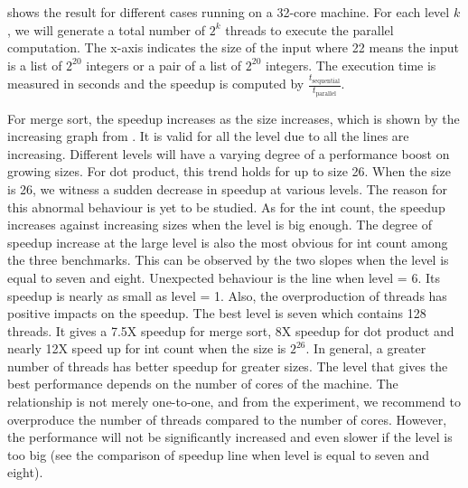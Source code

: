  shows the result for different cases running on a 32-core machine. For each level $k$, we will generate a total number of $2^k$ threads to execute the parallel computation. The x-axis indicates the size of the input where 22 means the input is a list of $2^20$ integers or a pair of a list of $2^20$ integers. The execution time is measured in seconds and the speedup is computed by $\frac{t_{\text{sequential}}}{t_\text{parallel}}$. 

For merge sort, the speedup increases as the size increases, which is shown by the increasing graph from . It is valid for all the level due to all the lines are increasing. Different levels will have a varying degree of a performance boost on growing sizes. For dot product, this trend holds for up to size 26. When the size is 26, we witness a sudden decrease in speedup at various levels. The reason for this abnormal behaviour is yet to be studied. As for the int count, the speedup increases against increasing sizes when the level is big enough. The degree of speedup increase at the large level is also the most obvious for int count among the three benchmarks. This can be observed by the two slopes when the level is equal to seven and eight. Unexpected behaviour is the line when level = 6. Its speedup is nearly as small as level = 1. Also, the overproduction of threads has positive impacts on the speedup. The best level is seven which contains 128 threads. It gives a 7.5X speedup for merge sort, 8X speedup for dot product and nearly 12X speed up for int count when the size is $2^{26}$. In general, a greater number of threads has better speedup for greater sizes. The level that gives the best performance depends on the number of cores of the machine. The relationship is not merely one-to-one, and from the experiment, we recommend to overproduce the number of threads compared to the number of cores. However, the performance will not be significantly increased and even slower if the level is too big (see the comparison of speedup line when level is equal to seven and eight).